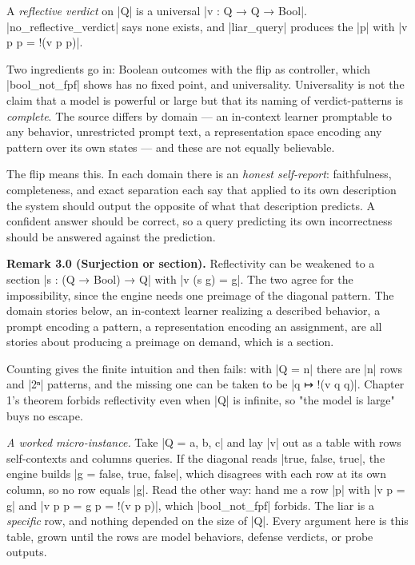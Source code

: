\documentclass{memoir}
\begin{document}
A \emph{reflective verdict} on \LeanVerb|Q| is a universal \LeanVerb|v : Q → Q → Bool|.
\LeanVerb|no_reflective_verdict| says none exists, and \LeanVerb|liar_query| produces
the \LeanVerb|p| with \LeanVerb|v p p = !(v p p)|.

Two ingredients go in: Boolean outcomes with the flip as controller, which
\LeanVerb|bool_not_fpf| shows has no fixed point, and universality. Universality is
not the claim that a model is powerful or large but that its naming of
verdict-patterns is \emph{complete}. The source differs by domain — an in-context
learner promptable to any behavior, unrestricted prompt text, a representation
space encoding any pattern over its own states — and these are not equally
believable.

The flip means this. In each domain there is an \emph{honest self-report}:
faithfulness, completeness, and exact separation each say that applied to its
own description the system should output the opposite of what that description
predicts. A confident answer should be correct, so a query predicting its own
incorrectness should be answered against the prediction.

\textbf{Remark 3.0 (Surjection or section).} Reflectivity can be weakened to a section
\LeanVerb|s : (Q → Bool) → Q| with \LeanVerb|v (s g) = g|. The two agree for the impossibility,
since the engine needs one preimage of the diagonal pattern. The domain stories
below, an in-context learner realizing a described behavior, a prompt encoding a
pattern, a representation encoding an assignment, are all stories about
producing a preimage on demand, which is a section.

Counting gives the finite intuition and then fails: with \LeanVerb|Q = n| there are \LeanVerb|n|
rows and \LeanVerb|2ⁿ| patterns, and the missing one can be taken to be \LeanVerb|q ↦ !(v q q)|.
Chapter 1's theorem forbids reflectivity even when \LeanVerb|Q| is infinite, so "the
model is large" buys no escape.

\emph{A worked micro-instance.} Take \LeanVerb|Q = a, b, c| and lay \LeanVerb|v| out as a table with
rows self-contexts and columns queries. If the diagonal reads \LeanVerb|true, false, true|,
the engine builds \LeanVerb|g = false, true, false|, which disagrees with each row at its
own column, so no row equals \LeanVerb|g|. Read the other way: hand me a row \LeanVerb|p| with \LeanVerb|v p = g|
and \LeanVerb|v p p = g p = !(v p p)|, which \LeanVerb|bool_not_fpf| forbids. The liar is a
\emph{specific} row, and nothing depended on the size of \LeanVerb|Q|. Every argument here is
this table, grown until the rows are model behaviors, defense verdicts, or probe
outputs.
\end{document}

